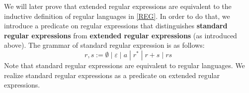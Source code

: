 
    
    We will later prove that extended regular expressions are equivalent to the inductive definition of regular languages in \ref{REG}.
    In order to do that, we introduce a predicate on regular expressions that distinguishes \textbf{standard regular expressions} 
    from \textbf{extended regular expressions} (as introduced above).
    The grammar of standard regular expression is as follows:
    \begin{equation*}
        r,s := \emptyset \; | \; \varepsilon \; | \; a \; | \; r^* \; | \; r + s \; | \; r s \; 
    \end{equation*}
    Note that standard regular expressions are equivalent to regular languages. 
    We realize standard regular expressions as a predicate on extended regular expressions.

